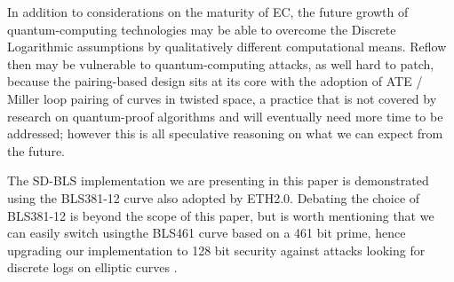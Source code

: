 \documentclass[conference]{IEEEtran}
\begin{document}
In addition to considerations on the maturity of EC, the future growth
of quantum-computing technologies may be able to overcome the Discrete
Logarithmic assumptions by qualitatively different computational
means. Reflow then may be vulnerable to quantum-computing attacks, as
well hard to patch, because the pairing-based design sits at its core
with the adoption of ATE / Miller loop pairing of curves in twisted
space, a practice that is not covered by research on quantum-proof
algorithms and will eventually need more time to be addressed; however
this is all speculative reasoning on what we can expect from the
future.

The SD-BLS implementation we are presenting in this paper is
demonstrated using the BLS381-12 curve \cite{bls381-12} also adopted
by ETH2.0. Debating the choice of BLS381-12 is beyond the scope of
this paper, but is worth mentioning that we can easily switch usingthe
BLS461 curve based on a 461 bit prime, hence upgrading our
implementation to 128 bit security \cite{updating-key-pairings}
against attacks looking for discrete logs on elliptic curves
\cite{discrete-log-attack}.



\end{document}

